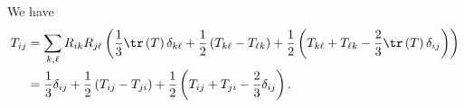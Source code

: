 \documentclass[10pt]{mypackage}
\begin{document}
\begin{solution}[29.23]
  We have
  \begin{align*}
    T_{ij} &= \sum_{k,\ell}R_{i k}R_{j\ell}\left( \frac{1}{3}\tr\left( T \right)\delta_{k \ell} + \frac{1}{2}\left( T_{k \ell} - T_{\ell k}  \right) + \frac{1}{2}\left( T_{k\ell} + T_{\ell k} - \frac{2}{3}\tr\left( T \right)\delta_{ij} \right) \right)\\
           &= \frac{1}{3}\delta_{ij} + \frac{1}{2}\left( T_{ij} - T_{ji} \right) + \frac{1}{2}\left( T_{ij} + T_{ji} - \frac{2}{3}\delta_{ij} \right).
  \end{align*}
\end{solution}
\begin{solution}[29.24]

\end{solution}
\begin{solution}[29.25]

\end{solution}
\end{document}
